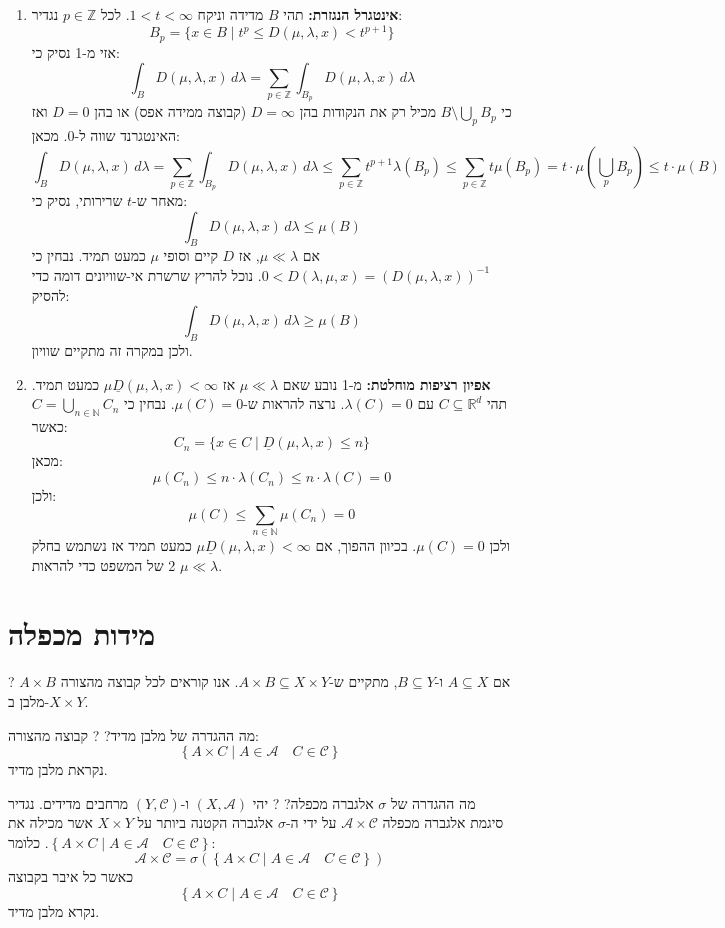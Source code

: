 \documentclass{tstextbook}
\begin{document}
\begin{enumerate}
  \item \textbf{אינטגרל הנגזרת:} 
תהי \(B\) מדידה וניקח \(1 < t < \infty\). לכל \(p \in \mathbb{Z}\) נגדיר:
$$ B_p = \{x \in B \mid t^p \leq D(\mu, \lambda, x) < t^{p+1}\} $$
אזי מ-1 נסיק כי:
$$ \int_B D(\mu, \lambda, x) \, d\lambda = \sum_{p \in \mathbb{Z}} \int_{B_p} D(\mu, \lambda, x) \, d\lambda $$
כי \(B \setminus \bigcup_p B_p\) מכיל רק את הנקודות בהן \(D = \infty\) (קבוצה ממידה אפס) או בהן \(D=0\) ואז האינטגרנד שווה ל-0. מכאן:
$$ \int_B D(\mu, \lambda, x) \, d\lambda = \sum_{p \in \mathbb{Z}} \int_{B_p} D(\mu, \lambda, x) \, d\lambda \leq \sum_{p \in \mathbb{Z}} t^{p+1} \lambda(B_p) \leq \sum_{p \in \mathbb{Z}} t \mu(B_p) = t \cdot \mu\left( \bigcup_p B_p \right) \leq t \cdot \mu(B) $$
מאחר ש-\(t\) שרירותי, נסיק כי:
$$ \int_B D(\mu, \lambda, x) \, d\lambda \leq \mu(B) $$
אם \(\mu \ll \lambda\), אז \(D\) קיים וסופי \(\mu\) כמעט תמיד. נבחין כי \(0 < D(\lambda, \mu, x) = (D(\mu, \lambda, x))^{-1}\). נוכל להריץ שרשרת אי-שוויונים דומה כדי להסיק:
$$ \int_B D(\mu, \lambda, x) \, d\lambda \geq \mu(B) $$
ולכן במקרה זה מתקיים שוויון.


  \item \textbf{אפיון רציפות מוחלטת:} 
מ-1 נובע שאם \(\mu \ll \lambda\) אז \(\underline{D}(\mu, \lambda, x) < \infty\)\(\mu\) כמעט תמיד. תהי \(C \subseteq \mathbb{R}^d\) עם \(\lambda(C) = 0\). נרצה להראות ש-\(\mu(C) = 0\). נבחין כי \(C = \bigcup_{n \in \mathbb{N}} C_n\) כאשר:
$$ C_n = \{x \in C \mid \underline{D}(\mu, \lambda, x) \leq n\} $$
מכאן:
$$ \mu(C_n) \leq n \cdot \lambda(C_n) \leq n \cdot \lambda(C) = 0 $$
ולכן:
$$ \mu(C) \leq \sum_{n \in \mathbb{N}} \mu(C_n) = 0 $$
ולכן \(\mu(C) = 0\). בכיוון ההפוך, אם \(\underline{D}(\mu, \lambda, x) < \infty\)\(\mu\) כמעט תמיד אז נשתמש בחלק 2 של המשפט כדי להראות \(\mu \ll \lambda\).


\end{enumerate}
\section{מידות מכפלה}

?
אם \(A \subseteq X\) ו-\(B \subseteq Y\), מתקיים ש-\(A \times B \subseteq X \times Y\). אנו קוראים לכל קבוצה מהצורה \(A \times B\) מלבן ב-\(X \times Y\).

מה ההגדרה של מלבן מדיד?
?
קבוצה מהצורה:
$$\left\{  A\times C\mid A \in \mathcal{A} \quad C \in \mathcal{C}   \right\}$$
נקראת מלבן מדיד.

מה ההגדרה של \(\sigma\) אלגברה מכפלה?
?
יהי \((X, \mathcal{A})\) ו-\((Y, \mathcal{C})\) מרחבים מדידים. נגדיר סיגמת אלגברה מכפלה \(\mathcal{A}\times \mathcal{ C}\) על ידי ה-\(\sigma\) אלגברה הקטנה ביותר על \(X\times Y\) אשר מכילה את \(\left\{  A\times C\mid A \in \mathcal{A} \quad C \in \mathcal{C}   \right\}\). כלומר:
$$\mathcal{A} \times \mathcal{C} =\sigma(\left\{  A\times C\mid A \in \mathcal{A} \quad C \in \mathcal{C}   \right\})$$
כאשר כל איבר בקבוצה 
$$\left\{  A\times C\mid A \in \mathcal{A} \quad C \in \mathcal{C}   \right\}$$
נקרא מלבן מדיד.
\end{document}
